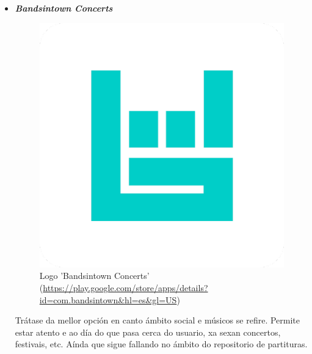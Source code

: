 \begin{itemize}
	\item \textbf{\textit{Bandsintown Concerts}} 
	
	\begin{figure}[h!]
		\centering
		\includegraphics[scale=0.3]{06_imagenes/intro/BandsintownConcerts.png}
		\caption{Logo 'Bandsintown Concerts' (\url{https://play.google.com/store/apps/details?id=com.bandsintown&hl=es&gl=US})}
	\end{figure}
	
	Trátase da mellor opción en canto ámbito social e músicos se refire. Permite estar atento e ao día do que pasa cerca do usuario, xa sexan concertos, festivais, etc. Aínda que sigue fallando no ámbito do repositorio de partituras.
	
\end{itemize}

